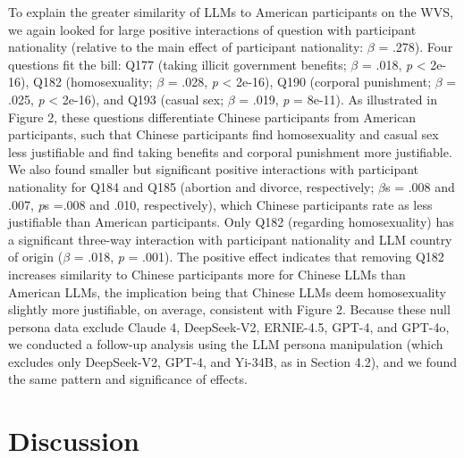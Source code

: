 \documentclass[11pt,a4paper]{article}
\begin{document}
\indent To explain the greater similarity of LLMs to American participants on the WVS, we again looked for large positive interactions of question with participant nationality (relative to the main effect of participant nationality: $\beta$ = .278). Four questions fit the bill: Q177 (taking illicit government benefits; $\beta$ = .018, \textit{p} < 2e-16), Q182 (homosexuality; $\beta$ = .028, \textit{p} < 2e-16), Q190 (corporal punishment; $\beta$ = .025, \textit{p} < 2e-16), and Q193 (casual sex; $\beta$ = .019, \textit{p} = 8e-11). As illustrated in Figure 2, these questions differentiate Chinese participants from American participants, such that Chinese participants find homosexuality and casual sex less justifiable and find taking benefits and corporal punishment more justifiable. We also found smaller but significant positive interactions with participant nationality for Q184 and Q185 (abortion and divorce, respectively; $\beta$s = .008 and .007, \textit{p}s =.008 and .010, respectively), which Chinese participants rate as less justifiable than American participants. Only Q182 (regarding homosexuality) has a significant three-way interaction with participant nationality and LLM country of origin ($\beta$ = .018, \textit{p} = .001). The positive effect indicates that removing Q182 increases similarity to Chinese participants more for Chinese LLMs than American LLMs, the implication being that Chinese LLMs deem homosexuality slightly more justifiable, on average, consistent with Figure 2. Because these null persona data exclude Claude 4, DeepSeek-V2, ERNIE-4.5, GPT-4, and GPT-4o, we conducted a follow-up analysis using the LLM persona manipulation (which excludes only DeepSeek-V2, GPT-4, and Yi-34B, as in Section 4.2), and we found the same pattern and significance of effects.

\section{Discussion}
\end{document}

